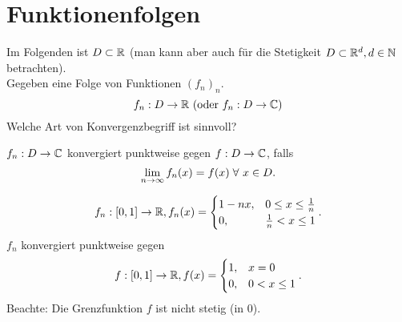 \documentclass[../ana1.tex]{subfiles}
\begin{document}
\setcounter{section}{19}
\section{Funktionenfolgen}
Im Folgenden ist \( D \subset \mathbb{R} \) (man kann aber auch 
für die Stetigkeit \( D \subset \mathbb{R}^d, d \in \mathbb{N} \) betrachten). \\
Gegeben eine Folge von Funktionen \( {(f_n)}_n \).
\[ f_n: D \rightarrow \mathbb{R} \ (\text{oder } f_n: D \rightarrow \mathbb{C}) \]
Welche Art von Konvergenzbegriff ist sinnvoll?
\begin{defi}
    \( f_n : D \rightarrow \mathbb{C} \) konvergiert punktweise 
    gegen \( f: D \rightarrow \mathbb{C} \), falls 
    \[ \limes{n} f_n(x) = f(x) \; \forall \, x \in D. \]
\end{defi}
\begin{bsp}
    \[ f_n: [0,1] \rightarrow \mathbb{R}, f_n(x) = \begin{cases}
        1 - nx, &0 \leq x \leq \frac{1}{n} \\
        0, &\frac{1}{n} < x \leq 1
    \end{cases}. \]
    \( f_n \) konvergiert punktweise gegen 
    \[ f: [0,1] \rightarrow \mathbb{R}, f(x) = 
    \begin{cases}
        1, &x = 0 \\
        0, &0 < x \leq 1
    \end{cases}. \]
    Beachte: Die Grenzfunktion \(f\) ist nicht stetig 
    (in \(0\)).
\end{bsp}
\end{document}

